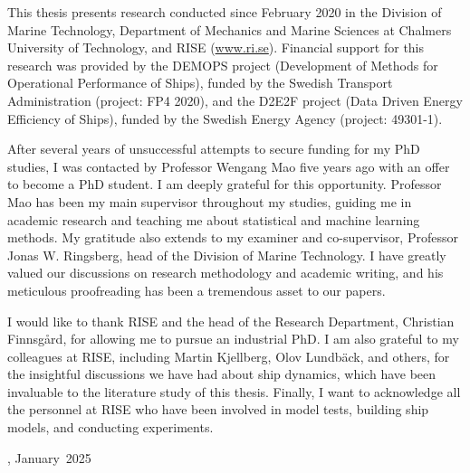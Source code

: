 This thesis presents research conducted since February 2020 in the Division of Marine Technology, Department of Mechanics and Marine Sciences at Chalmers University of Technology, and RISE (\href{www.ri.se}{www.ri.se}). Financial support for this research was provided by the DEMOPS project (Development of Methods for Operational Performance of Ships), funded by the Swedish Transport Administration (project: FP4 2020), and the D2E2F project (Data Driven Energy Efficiency of Ships), funded by the Swedish Energy Agency (project: 49301-1).

After several years of unsuccessful attempts to secure funding for my PhD studies, I was contacted by Professor Wengang Mao five years ago with an offer to become a PhD student. I am deeply grateful for this opportunity. Professor Mao has been my main supervisor throughout my studies, guiding me in academic research and teaching me about statistical and machine learning methods. My gratitude also extends to my examiner and co-supervisor, Professor Jonas W. Ringsberg, head of the Division of Marine Technology. I have greatly valued our discussions on research methodology and academic writing, and his meticulous proofreading has been a tremendous asset to our papers.

I would like to thank RISE and the head of the Research Department, Christian Finnsgård, for allowing me to pursue an industrial PhD. I am also grateful to my colleagues at RISE, including Martin Kjellberg, Olov Lundbäck, and others, for the insightful discussions we have had about ship dynamics, which have been invaluable to the literature study of this thesis. Finally, I want to acknowledge all the personnel at RISE who have been involved in model tests, building ship models, and conducting experiments.

\vskip 2pc

\noindent \thesisauthor

\noindent \thesiscity, January\ 2025 %
